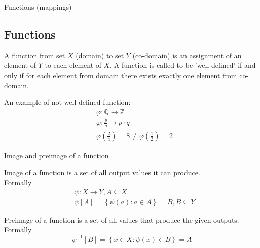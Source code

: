 \documentclass{beamer}
\begin{document}
\begin{frame}{Functions (mappings)}
    \subsection{Functions}
    \begin{definition}
        A function from set $X$ (domain) to set $Y$ (co-domain) is an assignment 
            of an element of $Y$ to each element of $X$. A function is called to 
            be 'well-defined' if and only if for each element from domain there 
            exists exactly one element from co-domain.  
    \end{definition}
    \begin{example}
        An example of not well-defined function: \\
        \begin{align*}
            & \varphi : \mathbb{Q} \to \mathbb{Z} \\
            & \varphi : \frac{p}{q} \mapsto p \cdot q \\
            & \varphi\left(\frac{2}{4}\right) = 8 \ne \varphi\left(\frac{1}{2}\right) = 2
        \end{align*}
    \end{example}
\end{frame}

\begin{frame}{Image and preimage of a function}
    \begin{definition}
        Image of a function is a set of all output values it can produce. \\
        Formally
        \begin{eqnarray*}
            & \psi : X \to Y, A \subseteq X \\
            & \psi[A] = \left\{\psi(a) : a \in A \right\} = B, B \subseteq Y
        \end{eqnarray*}
    \end{definition}
    \begin{definition}
        Preimage of a function is a set of all values that produce the given 
        outputs. Formally
        \begin{equation*}
            \psi^{-1}[B] = \left\{x \in X : \psi(x) \in B \right\} = A
        \end{equation*}
    \end{definition}
\end{frame}
\end{document}

